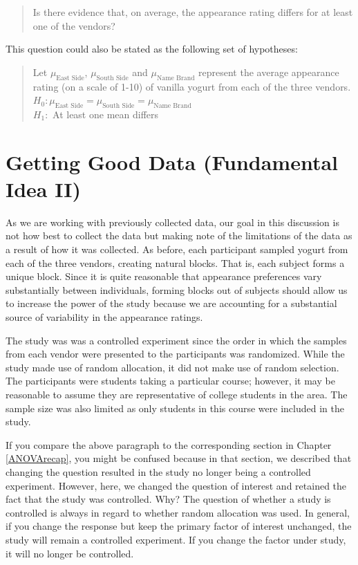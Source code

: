 \documentclass[
]{book}
\theoremstyle{plain}
\theoremstyle{mydefn}
\theoremstyle{myexmpl}
\theoremstyle{remark}
\begin{document}
\begin{quote}
Is there evidence that, on average, the appearance rating differs for at least one of the vendors?
\end{quote}

This question could also be stated as the following set of hypotheses:

\begin{quote}
Let \(\mu_{\text{East Side}}\), \(\mu_{\text{South Side}}\) and \(\mu_{\text{Name Brand}}\) represent the average appearance rating (on a scale of 1-10) of vanilla yogurt from each of the three vendors.\\
\(H_0: \mu_{\text{East Side}} = \mu_{\text{South Side}} = \mu_{\text{Name Brand}}\)\\
\(H_1:\) At least one mean differs
\end{quote}

\hypertarget{getting-good-data-fundamental-idea-ii-2}{%
\section{Getting Good Data (Fundamental Idea II)}\label{getting-good-data-fundamental-idea-ii-2}}

As we are working with previously collected data, our goal in this discussion is not how best to collect the data but making note of the limitations of the data as a result of how it was collected. As before, each participant sampled yogurt from each of the three vendors, creating natural blocks. That is, each subject forms a unique block. Since it is quite reasonable that appearance preferences vary substantially between individuals, forming blocks out of subjects should allow us to increase the power of the study because we are accounting for a substantial source of variability in the appearance ratings.

The study was was a controlled experiment since the order in which the samples from each vendor were presented to the participants was randomized. While the study made use of random allocation, it did not make use of random selection. The participants were students taking a particular course; however, it may be reasonable to assume they are representative of college students in the area. The sample size was also limited as only students in this course were included in the study.

If you compare the above paragraph to the corresponding section in Chapter \ref{ANOVArecap}, you might be confused because in that section, we described that changing the question resulted in the study no longer being a controlled experiment. However, here, we changed the question of interest and retained the fact that the study was controlled. Why? The question of whether a study is controlled is always in regard to whether random allocation was used. In general, if you change the response but keep the primary factor of interest unchanged, the study will remain a controlled experiment. If you change the factor under study, it will no longer be controlled.
\end{document}
